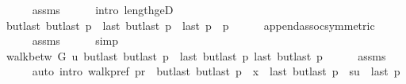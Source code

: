 \begin{isabellebody}
\ \ \ \ \isamarkupfalse%
\ assms{\isacharparenleft}{\kern0pt}{}{\isacharparenright}{\kern0pt}\isanewline
\ \ \ \ \isamarkupfalse%
\ {\isacharparenleft}{\kern0pt}intro\ length{\isacharunderscore}{\kern0pt}ge{\isacharunderscore}{\kern0pt}{}D{\isacharparenleft}{\kern0pt}{}{\isacharparenright}{\kern0pt}{\isacharparenright}{\kern0pt}\isanewline
\ \ \isamarkupfalse%
\ {\isachardoublequoteopen}butlast\ {\isacharparenleft}{\kern0pt}butlast\ p{\isacharparenright}{\kern0pt}\ {\isacharat}{\kern0pt}\ {\isacharbrackleft}{\kern0pt}last\ {\isacharparenleft}{\kern0pt}butlast\ p{\isacharparenright}{\kern0pt}{\isacharbrackright}{\kern0pt}\ {\isacharat}{\kern0pt}\ {\isacharbrackleft}{\kern0pt}last\ p{\isacharbrackright}{\kern0pt}\ {\isacharequal}{\kern0pt}\ p{\isachardoublequoteclose}\isanewline
\ \ \ \ \isamarkupfalse%
\ append{\isachardot}{\kern0pt}assoc{\isacharbrackleft}{\kern0pt}symmetric{\isacharbrackright}{\kern0pt}\isanewline
\ \ \ \ \isamarkupfalse%
\ assms{\isacharparenleft}{\kern0pt}{}{\isacharparenright}{\kern0pt}\isanewline
\ \ \ \ \isamarkupfalse%
\ simp\isanewline
\ \ \isamarkupfalse%
\ {\isachardoublequoteopen}walk{\isacharunderscore}{\kern0pt}betw\ G\ u\ {\isacharparenleft}{\kern0pt}butlast\ {\isacharparenleft}{\kern0pt}butlast\ p{\isacharparenright}{\kern0pt}\ {\isacharat}{\kern0pt}\ {\isacharbrackleft}{\kern0pt}last\ {\isacharparenleft}{\kern0pt}butlast\ p{\isacharparenright}{\kern0pt}{\isacharbrackright}{\kern0pt}{\isacharparenright}{\kern0pt}\ {\isacharparenleft}{\kern0pt}last\ {\isacharparenleft}{\kern0pt}butlast\ p{\isacharparenright}{\kern0pt}{\isacharparenright}{\kern0pt}{\isachardoublequoteclose}\isanewline
\ \ \ \ \isamarkupfalse%
\ assms{\isacharparenleft}{\kern0pt}{}{\isacharparenright}{\kern0pt}\isanewline
\ \ \ \ \isamarkupfalse%
\ {\isacharparenleft}{\kern0pt}auto\ intro{\isacharcolon}{\kern0pt}\ walk{\isacharunderscore}{\kern0pt}pref{\isacharbrackleft}{\kern0pt}\ {\isacharquery}{\kern0pt}pr\ {\isacharequal}{\kern0pt}\ {\isachardoublequoteopen}butlast\ {\isacharparenleft}{\kern0pt}butlast\ p{\isacharparenright}{\kern0pt}{\isachardoublequoteclose}\ \ {\isacharquery}{\kern0pt}x\ {\isacharequal}{\kern0pt}\ {\isachardoublequoteopen}last\ {\isacharparenleft}{\kern0pt}butlast\ p{\isacharparenright}{\kern0pt}{\isachardoublequoteclose}\ \ {\isacharquery}{\kern0pt}su\ {\isacharequal}{\kern0pt}\ {\isachardoublequoteopen}{\isacharbrackleft}{\kern0pt}last\ p{\isacharbrackright}{\kern0pt}{\isachardoublequoteclose}{\isacharbrackright}{\kern0pt}{\isacharparenright}{\kern0pt}\isanewline

\end{isabellebody}
